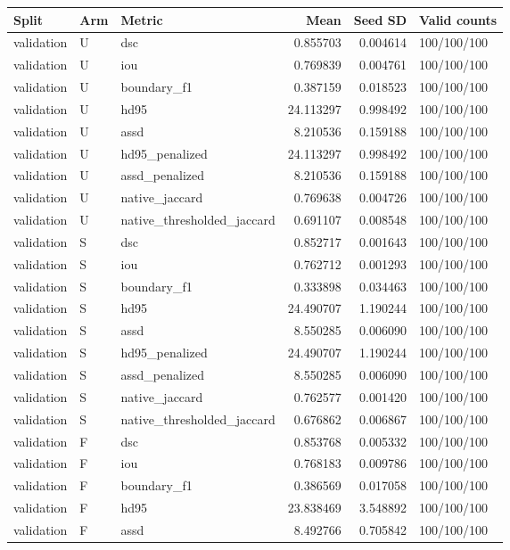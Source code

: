 \begin{tabular}{lllrrl}
Split & Arm & Metric & Mean & Seed SD & Valid counts \\
\hline
validation & U & dsc & 0.855703 & 0.004614 & 100/100/100 \\
validation & U & iou & 0.769839 & 0.004761 & 100/100/100 \\
validation & U & boundary\_f1 & 0.387159 & 0.018523 & 100/100/100 \\
validation & U & hd95 & 24.113297 & 0.998492 & 100/100/100 \\
validation & U & assd & 8.210536 & 0.159188 & 100/100/100 \\
validation & U & hd95\_penalized & 24.113297 & 0.998492 & 100/100/100 \\
validation & U & assd\_penalized & 8.210536 & 0.159188 & 100/100/100 \\
validation & U & native\_jaccard & 0.769638 & 0.004726 & 100/100/100 \\
validation & U & native\_thresholded\_jaccard & 0.691107 & 0.008548 & 100/100/100 \\
validation & S & dsc & 0.852717 & 0.001643 & 100/100/100 \\
validation & S & iou & 0.762712 & 0.001293 & 100/100/100 \\
validation & S & boundary\_f1 & 0.333898 & 0.034463 & 100/100/100 \\
validation & S & hd95 & 24.490707 & 1.190244 & 100/100/100 \\
validation & S & assd & 8.550285 & 0.006090 & 100/100/100 \\
validation & S & hd95\_penalized & 24.490707 & 1.190244 & 100/100/100 \\
validation & S & assd\_penalized & 8.550285 & 0.006090 & 100/100/100 \\
validation & S & native\_jaccard & 0.762577 & 0.001420 & 100/100/100 \\
validation & S & native\_thresholded\_jaccard & 0.676862 & 0.006867 & 100/100/100 \\
validation & F & dsc & 0.853768 & 0.005332 & 100/100/100 \\
validation & F & iou & 0.768183 & 0.009786 & 100/100/100 \\
validation & F & boundary\_f1 & 0.386569 & 0.017058 & 100/100/100 \\
validation & F & hd95 & 23.838469 & 3.548892 & 100/100/100 \\
validation & F & assd & 8.492766 & 0.705842 & 100/100/100 \\

\end{tabular}
